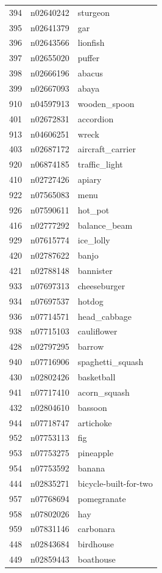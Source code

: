 \begin{table}
\begin{tabular}{cll}
394 & n02640242 & sturgeon \\
395 & n02641379 & gar \\
396 & n02643566 & lionfish \\
397 & n02655020 & puffer \\
398 & n02666196 & abacus \\
399 & n02667093 & abaya \\
910 & n04597913 & wooden_spoon \\
401 & n02672831 & accordion \\
913 & n04606251 & wreck \\
403 & n02687172 & aircraft_carrier \\
920 & n06874185 & traffic_light \\
410 & n02727426 & apiary \\
922 & n07565083 & menu \\
926 & n07590611 & hot_pot \\
416 & n02777292 & balance_beam \\
929 & n07615774 & ice_lolly \\
420 & n02787622 & banjo \\
421 & n02788148 & bannister \\
933 & n07697313 & cheeseburger \\
934 & n07697537 & hotdog \\
936 & n07714571 & head_cabbage \\
938 & n07715103 & cauliflower \\
428 & n02797295 & barrow \\
940 & n07716906 & spaghetti_squash \\
430 & n02802426 & basketball \\
941 & n07717410 & acorn_squash \\
432 & n02804610 & bassoon \\
944 & n07718747 & artichoke \\
952 & n07753113 & fig \\
953 & n07753275 & pineapple \\
954 & n07753592 & banana \\
444 & n02835271 & bicycle-built-for-two \\
957 & n07768694 & pomegranate \\
958 & n07802026 & hay \\
959 & n07831146 & carbonara \\
448 & n02843684 & birdhouse \\
449 & n02859443 & boathouse \\

\end{tabular}
\end{table}
